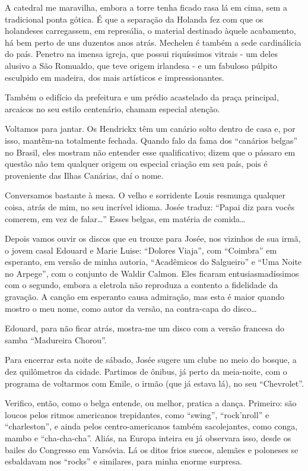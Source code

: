 A catedral me maravilha, embora a torre tenha ficado rasa lá em cima, sem a tradicional ponta gótica. É que a separação da Holanda fez com que os holandeses carregassem, em represália, o material destinado àquele acabamento, há bem perto de uns duzentos anos atrás. Mechelen é também a sede cardinálicia do país. Penetro na imensa igreja, que possui riquíssimos vitrais - um deles alusivo a São Romualdo, que teve origem irlandesa - e um fabuloso púlpito esculpido em madeira, dos mais artísticos e impressionantes.

Também o edifício da prefeitura e um prédio acastelado da praça principal, arcaicos no seu estilo centenário, chamam especial atenção.

Voltamos para jantar. Os Hendrickx têm um canário solto dentro de casa e, por isso, mantêm-na totalmente fechada. Quando falo da fama dos “canários belgas” no Brasil, eles mostram não entender esse qualificativo; dizem que o pássaro em questão não tem qualquer origem ou especial criação em seu país, pois é proveniente das Ilhas Canárias, daí o nome.

Conversamos bastante à mesa. O velho e sorridente Louis resmunga qualquer coisa, atrás de mim, no seu incrível idioma. Josée traduz: “Papai diz para vocês comerem, em vez de falar\ldots” Esses belgas, em matéria de comida\ldots

Depois vamos ouvir os discos que eu trouxe para Josée, nos vizinhos de sua irmã, o jovem casal Edouard e Marie Luise: “Dolores Viaja”, com “Coimbra” em esperanto, em versão de minha autoria, “Acadêmicos do Salgueiro” e “Uma Noite no Arpege”, com o conjunto de Waldir Calmon. Eles ficaram entusiasmadíssimos com o segundo, embora a eletrola não reproduza a contento a fidelidade da gravação. A canção em esperanto causa admiração, mas esta é maior quando mostro o meu nome, como autor da versão, na contra-capa do disco\ldots

Edouard, para não ficar atrás, mostra-me um disco com a versão francesa do samba “Madureira Chorou”.

Para encerrar esta noite de sábado, Josée sugere um clube no meio do bosque, a dez quilômetros da cidade. Partimos de ônibus, já perto da meia-noite, com o programa de voltarmos com Emile, o irmão (que já estava lá), no seu “Chevrolet”.

Verifico, então, como o belga entende, ou melhor, pratica a dança. Primeiro: são loucos pelos ritmos americanos trepidantes, como “swing”, “rock’nroll” e “charleston”, e ainda pelos centro-americanos também sacolejantes, como conga, mambo e “cha-cha-cha”. Aliás, na Europa inteira eu já observara isso, desde os bailes do Congresso em Varsóvia. Lá os ditos frios suecos, alemães e poloneses se esbaldavam nos “rocks” e similares, para minha enorme surpresa.

